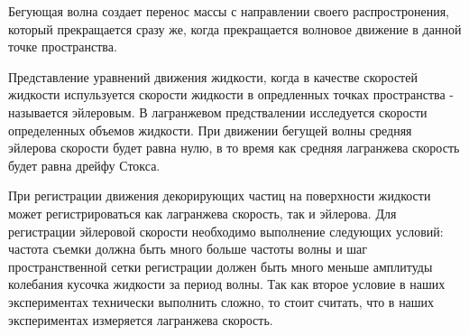 Бегующая волна создает перенос массы с направлении своего распростронения, который прекращается сразу же, когда прекращается волновое движение в данной точке пространства.

Представление уравнений движения жидкости, когда в качестве скоростей жидкости испульзуется скорости жидкости в опредленных точках пространства - называется эйлеровым. В лагранжевом предствалении исследуется скорости определенных объемов жидкости. При движении бегущей волны средняя эйлерова скорости будет равна нулю, в то время как средняя лагранжева скорость будет равна дрейфу Стокса.

При регистрации движения декорирующих частиц на поверхности жидкости может регистрироваться как лагранжева скорость, так и эйлерова. Для регистрации эйлеровой скорости необходимо выполнение следующих условий: частота съемки должна быть много больше частоты волны и шаг пространственной сетки регистрации должен быть много меньше амплитуды колебания кусочка жидкости за период волны. Так как второе условие в наших экспериментах технически выполнить сложно, то стоит считать, что в наших экспериментах измеряется лагранжева скорость.










%
%
%
%
%
%
